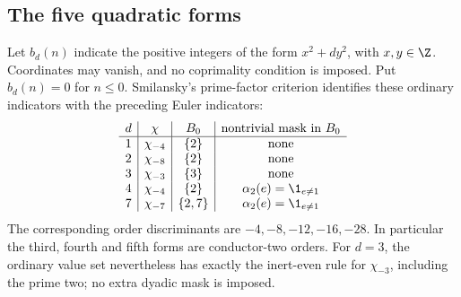 \subsection{The five quadratic forms}

Let \(b_d(n)\) indicate the positive integers of the form
\(x^2+dy^2\), with \(x,y\in\Z\). Coordinates may vanish,
and no coprimality condition is imposed. Put \(b_d(n)=0\)
for \(n\le0\). Smilansky's
prime-factor criterion \cite[Theorem 10]{smilansky} identifies
these ordinary indicators with the preceding Euler indicators:
\[
\begin{array}{c|c|c|c}
d&\chi&B_0&\text{nontrivial mask in }B_0\\\hline
1&\chi_{-4}&\{2\}&\text{none}\\
2&\chi_{-8}&\{2\}&\text{none}\\
3&\chi_{-3}&\{3\}&\text{none}\\
4&\chi_{-4}&\{2\}&\alpha_2(e)=\1_{e\ne1}\\
7&\chi_{-7}&\{2,7\}&\alpha_2(e)=\1_{e\ne1}
\end{array}
\]
The corresponding order discriminants are \(-4,-8,-12,-16,-28\).
In particular the third, fourth and fifth forms are conductor-two
orders. For \(d=3\), the ordinary value set nevertheless has
exactly the inert-even rule for \(\chi_{-3}\), including the
prime two; no extra dyadic mask is imposed.



